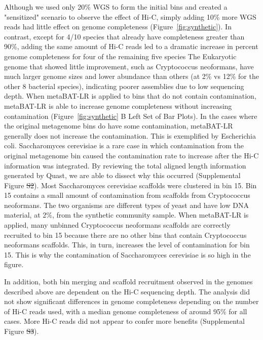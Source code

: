 \documentclass[fleqn,10pt,lineno]{wlpeerj}
\providecommand{\DIFaddtex}[1]{{\protect\color{blue}\uwave{#1}}} %
\providecommand{\DIFdeltex}[1]{{\protect\color{red}\sout{#1}}}                      %
\providecommand{\DIFaddbegin}{} %
\providecommand{\DIFaddend}{} %
\providecommand{\DIFdelbegin}{} %
\providecommand{\DIFdelend}{} %
\providecommand{\DIFadd}[1]{\texorpdfstring{\DIFaddtex{#1}}{#1}} %
\providecommand{\DIFdel}[1]{\texorpdfstring{\DIFdeltex{#1}}{}} %
\newcommand{\DIFscaledelfig}{0.5}
\newlength{\DIFdelgraphicswidth} %
\newlength{\DIFdelgraphicsheight} %
\newcommand{\DIFaddincludegraphics}[2][]{{\color{blue}\fbox{\DIFOincludegraphics[#1]{#2}}}} %
\newcommand{\DIFdelincludegraphics}[2][]{%
\sbox{\DIFdelgraphicsbox}{\DIFOincludegraphics[#1]{#2}}%
\settoboxwidth{\DIFdelgraphicswidth}{\DIFdelgraphicsbox} %
\settoboxtotalheight{\DIFdelgraphicsheight}{\DIFdelgraphicsbox} %
\scalebox{\DIFscaledelfig}{%
\parbox[b]{\DIFdelgraphicswidth}{\usebox{\DIFdelgraphicsbox}\\[-\baselineskip] \rule{\DIFdelgraphicswidth}{0em}}\llap{\resizebox{\DIFdelgraphicswidth}{\DIFdelgraphicsheight}{%
\setlength{\unitlength}{\DIFdelgraphicswidth}%
\begin{picture}(1,1)%
\thicklines\linethickness{2pt} %
{\color[rgb]{1,0,0}\put(0,0){\framebox(1,1){}}}%
{\color[rgb]{1,0,0}\put(0,0){\line( 1,1){1}}}%
{\color[rgb]{1,0,0}\put(0,1){\line(1,-1){1}}}%
\end{picture}%
}\hspace*{3pt}}} %
} %
\DeclareRobustCommand{\DIFaddbegin}{\DIFOaddbegin \let\includegraphics\DIFaddincludegraphics} %
\DeclareRobustCommand{\DIFaddend}{\DIFOaddend \let\includegraphics\DIFOincludegraphics} %
\DeclareRobustCommand{\DIFdelbegin}{\DIFOdelbegin \let\includegraphics\DIFdelincludegraphics} %
\DeclareRobustCommand{\DIFdelend}{\DIFOaddend \let\includegraphics\DIFOincludegraphics} %
\begin{document}
Although we used only 20\% WGS to form the initial bins and created a "sensitized" scenario to observe the effect of Hi-C, simply adding 10\% more WGS reads had little effect on genome completeness (Figure~\ref{fig:synthetic}). In contrast, except for 4/10 species that already have completeness greater than 90\%, adding the same amount of Hi-C reads led to a dramatic increase in percent genome completeness for four of the remaining five species  The Eukaryotic genome that showed little improvement, such as Cryptococcus neoformans, have much larger genome sizes and lower abundance than others (at 2\% vs 12\% for the other 8 bacterial species), indicating poorer assemblies due to low sequencing depth. When metaBAT-LR is applied to bins that do not contain contamination, metaBAT-LR is able to increase genome completeness without increasing contamination (Figure~\ref{fig:synthetic} B Left Set of Bar Plots). In the cases where the original metagenome bins do have some contamination, metaBAT-LR generally does not increase the contamination. This is exemplified by Escherichia coli. Saccharomyces cerevisiae is a rare case in which contamination from the original metagenome bin caused the contamination rate to increase after the Hi-C information was integrated. By reviewing the total aligned length information generated by Quast, we are able to dissect why this occurred (Supplemental Figure \DIFdelbegin \DIFdel{S2}\DIFdelend \DIFaddbegin \DIFadd{S3}\DIFaddend ). Most Saccharomyces cerevisiae scaffolds were clustered in bin 15. Bin 15 contains a small amount of contamination from scaffolds from Cryptococcus neoformans. The two organisms are different types of yeast and have low DNA material, at 2\%, from the synthetic community sample. When metaBAT-LR is applied, many unbinned Cryptococcus neoformans scaffolds are correctly recruited to bin 15 because there are no other bins that contain Cryptococcus neoformans scaffolds. This, in turn, increases the level of contamination for bin 15. This is why the contamination of Saccharomyces cerevisiae is so high in the figure.


In addition, both bin merging and scaffold recruitment observed in the genomes described above are dependent on the Hi-C sequencing depth. The analysis did not show significant differences in genome completeness depending on the number of Hi-C reads used, with a median genome completeness of around 95\% for all cases.  
More Hi-C reads did not appear to confer more benefits (Supplemental Figure \DIFdelbegin \DIFdel{S3}\DIFdelend \DIFaddbegin \DIFadd{S4}\DIFaddend ).   
\end{document}
